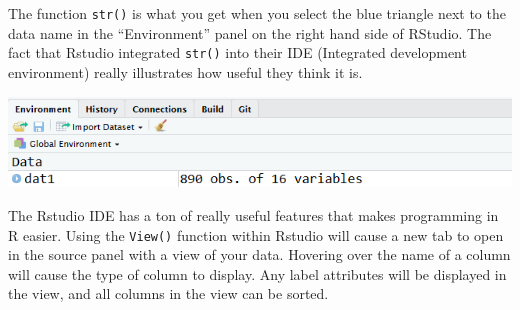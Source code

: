 \documentclass[
]{book}
\newenvironment{Shaded}{\begin{snugshade}}{\end{snugshade}}
\newcommand{\DecValTok}[1]{\textcolor[rgb]{0.00,0.00,0.81}{#1}}
\newcommand{\KeywordTok}[1]{\textcolor[rgb]{0.13,0.29,0.53}{\textbf{#1}}}
\newcommand{\NormalTok}[1]{#1}
\newcommand{\OperatorTok}[1]{\textcolor[rgb]{0.81,0.36,0.00}{\textbf{#1}}}
\newcommand{\StringTok}[1]{\textcolor[rgb]{0.31,0.60,0.02}{#1}}
\begin{document}
\begin{Shaded}
\end{Shaded}

The function \texttt{str()} is what you get when you select the blue triangle next to the data name in the ``Environment'' panel on the right hand side of RStudio. The fact that Rstudio integrated \texttt{str()} into their IDE (Integrated development environment) really illustrates how useful they think it is.

\includegraphics{images/str1.png}

The Rstudio IDE has a ton of really useful features that makes programming in R easier. Using the \texttt{View()} function within Rstudio will cause a new tab to open in the source panel with a view of your data. Hovering over the name of a column will cause the type of column to display. Any label attributes will be displayed in the view, and all columns in the view can be sorted.
\end{document}
